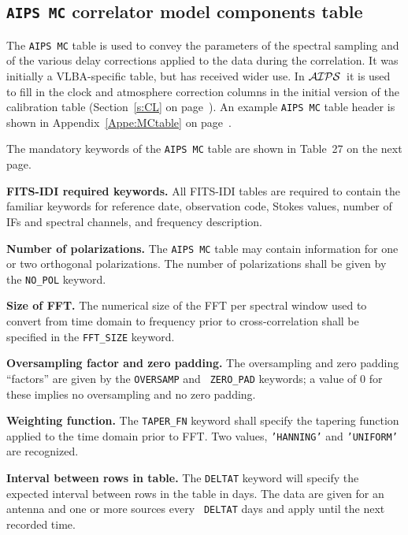 \documentclass[twoside]{article}
\newcommand{\AIPS}{{$\cal AIPS\/$}}
\begin{document}
\subsection{{\tt AIPS MC} correlator model components table}
\label{s:MC}

The {\tt AIPS MC} table is used to convey the parameters of the
spectral sampling and of the various delay corrections applied to the
data during the correlation.  It was initially a VLBA-specific table,
but has received wider use.  In \AIPS\ it is used to fill in the clock
and atmosphere correction columns in the initial version of the
calibration table (Section~\ref{s:CL} on page~\pageref{s:CL}).
An example {\tt AIPS MC} table header is shown in
Appendix~\ref{Appe:MCtable} on page~\pageref{Appe:MCtable}.

The mandatory keywords of the {\tt AIPS MC} table are shown in
Table~27 on the next page.

{\bf FITS-IDI required keywords.}  All FITS-IDI tables are required to
contain the familiar keywords for reference date, observation code,
Stokes values, number of IFs and spectral channels, and frequency
description.

{\bf Number of polarizations.}  The {\tt AIPS MC} table may contain
information for one or two orthogonal polarizations.  The number of
polarizations shall be given by the {\tt NO\_POL} keyword.

{\bf Size of FFT.} The numerical size of the FFT per spectral window
used to convert from time domain to frequency prior to
cross-correlation shall be specified in the {\tt FFT\_SIZE} keyword.

{\bf Oversampling factor and zero padding.} The oversampling and zero
padding ``factors'' are given by the {\tt OVERSAMP} and {\tt
  ZERO\_PAD} keywords; a value of 0 for these implies no oversampling
and no zero padding.

{\bf Weighting function.}  The {\tt TAPER\_FN} keyword shall specify
the tapering function applied to the time domain prior to FFT\@.  Two
values, {\tt 'HANNING'} and {\tt 'UNIFORM'} are recognized.

{\bf Interval between rows in table.} The {\tt DELTAT} keyword will
specify the expected interval between rows in the table in days.  The
data are given for an antenna and one or more sources every {\tt
  DELTAT} days and apply until the next recorded time.
\end{document}
